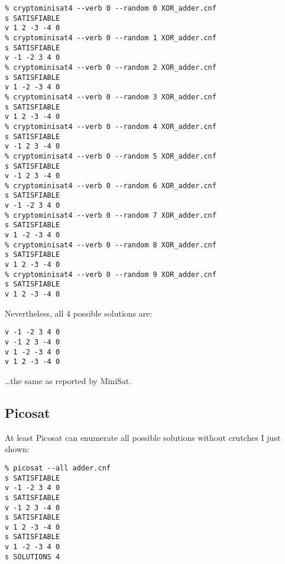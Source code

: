\begin{lstlisting}
% cryptominisat4 --verb 0 --random 0 XOR_adder.cnf
s SATISFIABLE
v 1 2 -3 -4 0
% cryptominisat4 --verb 0 --random 1 XOR_adder.cnf
s SATISFIABLE
v -1 -2 3 4 0
% cryptominisat4 --verb 0 --random 2 XOR_adder.cnf
s SATISFIABLE
v 1 -2 -3 4 0
% cryptominisat4 --verb 0 --random 3 XOR_adder.cnf
s SATISFIABLE
v 1 2 -3 -4 0
% cryptominisat4 --verb 0 --random 4 XOR_adder.cnf
s SATISFIABLE
v -1 2 3 -4 0
% cryptominisat4 --verb 0 --random 5 XOR_adder.cnf
s SATISFIABLE
v -1 2 3 -4 0
% cryptominisat4 --verb 0 --random 6 XOR_adder.cnf
s SATISFIABLE
v -1 -2 3 4 0
% cryptominisat4 --verb 0 --random 7 XOR_adder.cnf
s SATISFIABLE
v 1 -2 -3 4 0
% cryptominisat4 --verb 0 --random 8 XOR_adder.cnf
s SATISFIABLE
v 1 2 -3 -4 0
% cryptominisat4 --verb 0 --random 9 XOR_adder.cnf
s SATISFIABLE
v 1 2 -3 -4 0
\end{lstlisting}

Nevertheless, all 4 possible solutions are:

\begin{lstlisting}
v -1 -2 3 4 0
v -1 2 3 -4 0
v 1 -2 -3 4 0
v 1 2 -3 -4 0
\end{lstlisting}

\dots the same as reported by MiniSat.

\subsection{Picosat}

At least Picosat can enumerate all possible solutions without crutches I just shown:

\begin{lstlisting}
% picosat --all adder.cnf
s SATISFIABLE
v -1 -2 3 4 0
s SATISFIABLE
v -1 2 3 -4 0
s SATISFIABLE
v 1 2 -3 -4 0
s SATISFIABLE
v 1 -2 -3 4 0
s SOLUTIONS 4
\end{lstlisting}







